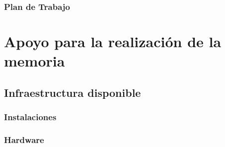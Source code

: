 \documentclass[11pt,letterpaper]{article}
\begin{document}
\subsubsection{Plan de Trabajo}

\section{Apoyo para la realización de la memoria}
\subsection{Infraestructura disponible}

\subsubsection{Instalaciones}
%
\subsubsection{Hardware}
\end{document}
